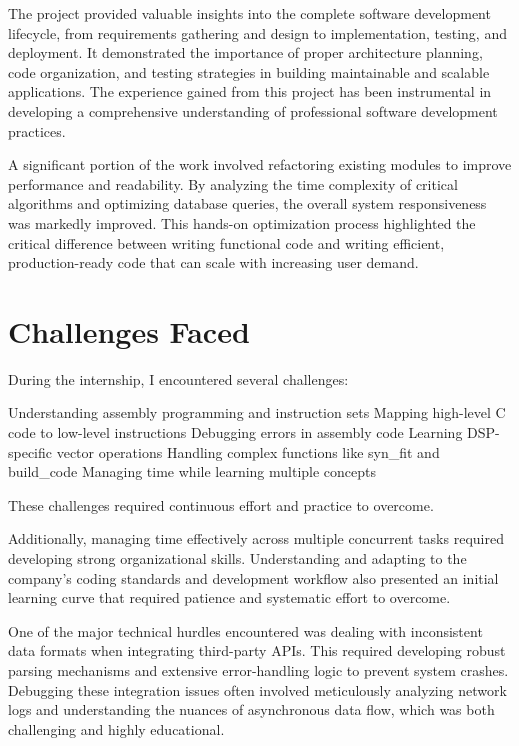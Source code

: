 \documentclass[12pt,a4paper]{report}
\begin{document}
The project provided valuable insights into the complete software development lifecycle, from requirements gathering and design to implementation, testing, and deployment. It demonstrated the importance of proper architecture planning, code organization, and testing strategies in building maintainable and scalable applications. The experience gained from this project has been instrumental in developing a comprehensive understanding of professional software development practices.


A significant portion of the work involved refactoring existing modules to improve performance and readability. By analyzing the time complexity of critical algorithms and optimizing database queries, the overall system responsiveness was markedly improved. This hands-on optimization process highlighted the critical difference between writing functional code and writing efficient, production-ready code that can scale with increasing user demand.




\section{Challenges Faced}

During the internship, I encountered several challenges:


Understanding assembly programming and instruction sets Mapping high-level C code to low-level instructions Debugging errors in assembly code Learning DSP-specific vector operations Handling complex functions like syn\_fit and build\_code Managing time while learning multiple concepts


These challenges required continuous effort and practice to overcome.


Additionally, managing time effectively across multiple concurrent tasks required developing strong organizational skills. Understanding and adapting to the company's coding standards and development workflow also presented an initial learning curve that required patience and systematic effort to overcome.


One of the major technical hurdles encountered was dealing with inconsistent data formats when integrating third-party APIs. This required developing robust parsing mechanisms and extensive error-handling logic to prevent system crashes. Debugging these integration issues often involved meticulously analyzing network logs and understanding the nuances of asynchronous data flow, which was both challenging and highly educational.
\end{document}
